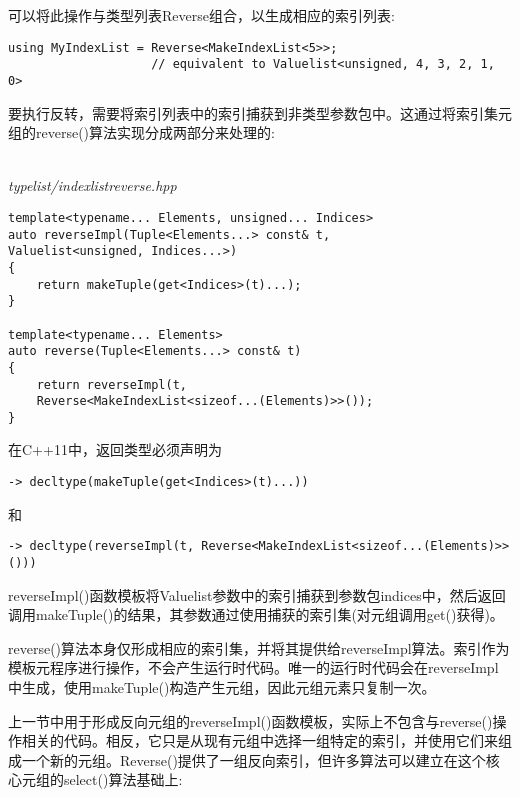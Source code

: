 可以将此操作与类型列表Reverse组合，以生成相应的索引列表:

\begin{lstlisting}[style=styleCXX]
using MyIndexList = Reverse<MakeIndexList<5>>;
					// equivalent to Valuelist<unsigned, 4, 3, 2, 1, 0>
\end{lstlisting}

要执行反转，需要将索引列表中的索引捕获到非类型参数包中。这通过将索引集元组的reverse()算法实现分成两部分来处理的:

\hspace*{\fill} \\ %
\noindent
\textit{typelist/indexlistreverse.hpp}
\begin{lstlisting}[style=styleCXX]
template<typename... Elements, unsigned... Indices>
auto reverseImpl(Tuple<Elements...> const& t,
Valuelist<unsigned, Indices...>)
{
	return makeTuple(get<Indices>(t)...);
}

template<typename... Elements>
auto reverse(Tuple<Elements...> const& t)
{
	return reverseImpl(t,
	Reverse<MakeIndexList<sizeof...(Elements)>>());
}
\end{lstlisting}

在C++11中，返回类型必须声明为

\begin{lstlisting}[style=styleCXX]
-> decltype(makeTuple(get<Indices>(t)...))
\end{lstlisting}

和

\begin{lstlisting}[style=styleCXX]
-> decltype(reverseImpl(t, Reverse<MakeIndexList<sizeof...(Elements)>>()))
\end{lstlisting}

reverseImpl()函数模板将Valuelist参数中的索引捕获到参数包indices中，然后返回调用makeTuple()的结果，其参数通过使用捕获的索引集(对元组调用get()获得)。

reverse()算法本身仅形成相应的索引集，并将其提供给reverseImpl算法。索引作为模板元程序进行操作，不会产生运行时代码。唯一的运行时代码会在reverseImpl中生成，使用makeTuple()构造产生元组，因此元组元素只复制一次。


上一节中用于形成反向元组的reverseImpl()函数模板，实际上不包含与reverse()操作相关的代码。相反，它只是从现有元组中选择一组特定的索引，并使用它们来组成一个新的元组。Reverse()提供了一组反向索引，但许多算法可以建立在这个核心元组的select()算法基础上:

